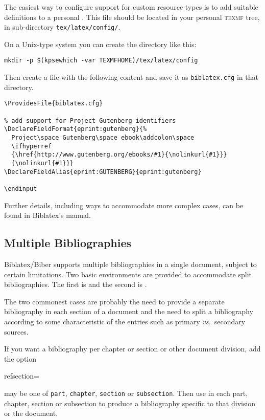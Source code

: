 The easiest way to configure support for custom resource types is to add suitable definitions to a personal .
This file should be located in your personal \textsc{texmf} tree, in sub-directory \texttt{tex/latex/config/}.

On a Unix-type system you can create the directory like this:
\begin{verbatim}
mkdir -p $(kpsewhich -var TEXMFHOME)/tex/latex/config
\end{verbatim}
Then create a file with the following content and save it as \texttt{biblatex.cfg} in that directory.
\begin{verbatim}
\ProvidesFile{biblatex.cfg}

% add support for Project Gutenberg identifiers
\DeclareFieldFormat{eprint:gutenberg}{%
  Project\space Gutenberg\space ebook\addcolon\space
  \ifhyperref
  {\href{http://www.gutenberg.org/ebooks/#1}{\nolinkurl{#1}}}
  {\nolinkurl{#1}}}
\DeclareFieldAlias{eprint:GUTENBERG}{eprint:gutenberg}

\endinput
\end{verbatim}
Further details, including ways to accommodate more complex cases, can be found in Biblatex's manual.


\subsection{Multiple Bibliographies}\label{subsec:multibib}

Biblatex/Biber supports multiple bibliographies in a single document, subject to certain limitations.
Two basic environments are provided to accommodate split bibliographies.
The first is  and the second is .

The two commonest cases are probably the need to provide a separate bibliography in each section of a document and the need to split a bibliography according to some characteristic of the entries such as primary \emph{vs.}\ secondary sources.

If you want a bibliography per chapter or section or other document division, add the option
\begin{semiverbatim}
  refsection=
\end{semiverbatim}
 may be one of \texttt{part}, \texttt{chapter}, \texttt{section} or \texttt{subsection}.
Then use  in each part, chapter, section or subsection to produce a bibliography specific to that division or the document.

